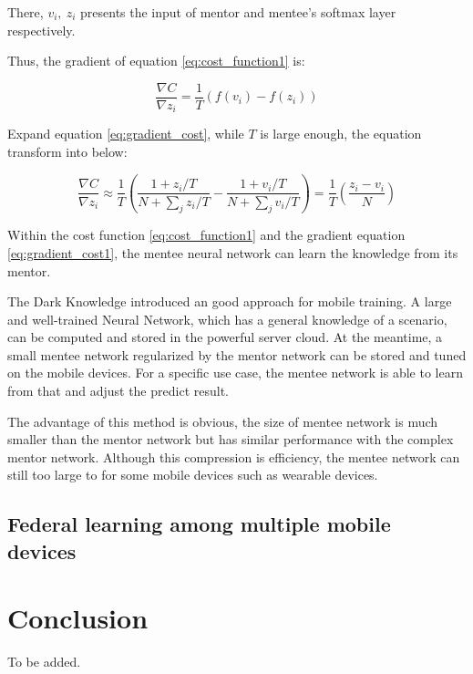 \documentclass[article]{aaltoseries}
\begin{document}
There, \(v_i,\ z_i\) presents the input of mentor and mentee's softmax layer respectively.

Thus, the gradient of equation \ref{eq:cost_function1} is:

\begin{equation} \label{eq:gradient_cost}
  \frac{\nabla C}{\nabla z_i} = \frac{1}{T}(f(v_i) - f(z_i))
\end{equation}

Expand equation \ref{eq:gradient_cost}, while \(T\) is large enough, the equation transform into below:

\begin{equation} \label{eq:gradient_cost1}
  \frac{\nabla C}{\nabla z_i} \approx \frac{1}{T}( \frac{1+z_i/T}{N+\sum_j z_i/T} - \frac{1+v_i/T}{N+\sum_j v_i/T} ) = \frac{1}{T} (\frac{z_i - v_i}{N})
\end{equation}

Within the cost function \ref{eq:cost_function1} and the gradient equation \ref{eq:gradient_cost1}, 
the mentee neural network can learn the knowledge from its mentor.

The Dark Knowledge introduced an good approach for mobile training. 
A large and well-trained Neural Network, which has a general knowledge of a scenario, can be computed and stored in the powerful server cloud.
At the meantime, a small mentee network regularized by the mentor network can be stored and tuned on the mobile devices.
For a specific use case, the mentee network is able to learn from that and adjust the predict result. 



The advantage of this method is obvious, 
the size of mentee network is much smaller than the mentor network but has similar performance
with the complex mentor network. 
Although this compression is efficiency, the mentee network can still too large to for some mobile
devices such as wearable devices.


\subsection{Federal learning among multiple mobile devices}








\section{Conclusion}

To be added.






\end{document}
